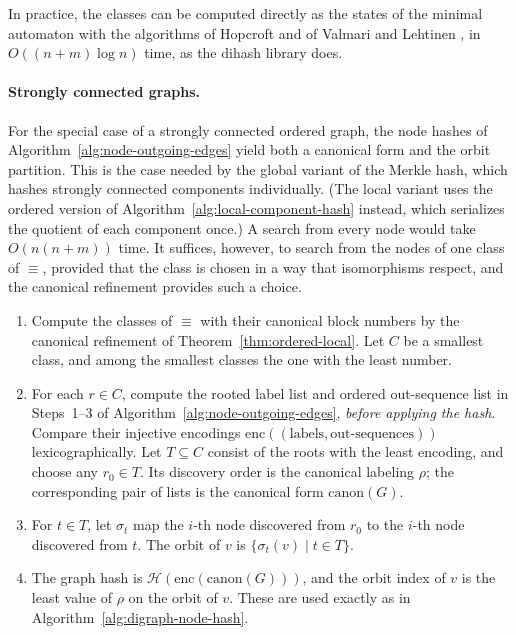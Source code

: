 \documentclass[twoside,leqno]{article}
\newcommand{\enc}{\mathrm{enc}}
\newcommand{\canon}{\mathrm{canon}}
\begin{document}
In practice, the classes can be computed directly as the states of the minimal automaton with the algorithms of Hopcroft and of Valmari and Lehtinen \cite{hopcraft,valmari2008partial}, in $O((n+m)\log n)$ time, as the dihash library does.

\paragraph{Strongly connected graphs.} For the special case of a strongly connected ordered graph, the node hashes of Algorithm~\ref{alg:node-outgoing-edges} yield both a canonical form and the orbit partition. This is the case needed by the global variant of the Merkle hash, which hashes strongly connected components individually. (The local variant uses the ordered version of Algorithm~\ref{alg:local-component-hash} instead, which serializes the quotient of each component once.) A search from every node would take $O(n(n+m))$ time. It suffices, however, to search from the nodes of one class of $\equiv$, provided that the class is chosen in a way that isomorphisms respect, and the canonical refinement provides such a choice.

\begin{algorithm}[t]
    \caption{Canonization and Orbit Partitioning for Strongly Connected Ordered Graphs}
    \label{alg:scc-outgoing-edges}
    \begin{enumerate}
        \item Compute the classes of $\equiv$ with their canonical block numbers by the canonical refinement of Theorem~\ref{thm:ordered-local}. Let $C$ be a smallest class, and among the smallest classes the one with the least number.
        \item For each $r\in C$, compute the rooted label list and ordered out-sequence list in Steps~1--3 of Algorithm~\ref{alg:node-outgoing-edges}, \emph{before applying the hash}. Compare their injective encodings $\enc((\text{labels},\text{out-sequences}))$ lexicographically. Let $T\subseteq C$ consist of the roots with the least encoding, and choose any $r_0\in T$. Its discovery order is the canonical labeling $\rho$; the corresponding pair of lists is the canonical form $\canon(G)$.
        \item For $t\in T$, let $\sigma_t$ map the $i$-th node discovered from $r_0$ to the $i$-th node discovered from $t$. The orbit of $v$ is $\{\sigma_t(v)\mid t\in T\}$.
        \item The graph hash is $\mathcal{H}(\enc(\canon(G)))$, and the orbit index of $v$ is the least value of $\rho$ on the orbit of $v$. These are used exactly as in Algorithm~\ref{alg:digraph-node-hash}.
    \end{enumerate}
\end{algorithm}
\end{document}
